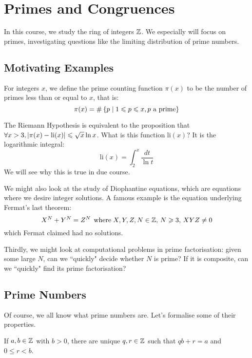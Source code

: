 \documentclass{article}
\begin{document}
\makecover

\section{Primes and Congruences}

In this course, we study the ring of integers $\mathbb{Z}$. We especially will focus on primes, investigating questions like the limiting distribution of prime numbers.

\subsection{Motivating Examples}
\label{subsection-intro-motivating-examples}

For integers $x$, we define the prime counting function $\pi (x)$ to be the number of primes less than or equal to $x$, that is:
\[
\pi (x) = \# \left\lbrace p \mid 1 \leqslant p \leqslant x, p \text{ a prime}  \right\rbrace
\]

The Riemann Hypothesis is equivalent to the proposition that
$\forall x > 3, \left\lvert \pi (x) - \mathrm{li} (x) \right\rvert \leqslant \sqrt{x} \ln x$.
What is this function $\mathrm{li} (x)$? It is the logarithmic integral:
\[
\mathrm{li} (x) = \int_2^x \frac{dt}{\ln t}
\]
We will see why this is true in due course.

We might also look at the study of Diophantine equations, which are equations where we desire integer solutions. A famous example is the equation underlying Fermat's last theorem:
\[
X^N + Y^N = Z^N \mathrel{\, \text{where}} X, Y, Z, N \in \mathbb{Z}, \, N \geqslant 3, \, XYZ \neq 0
\]
which Fermat claimed had no solutions.

Thirdly, we might look at computational problems in prime factorisation: given some large $N$, can we ``quickly" decide whether $N$ is prime?
If it is composite, can we ``quickly" find its prime factorisation?


\subsection{Prime Numbers}
\label{subsection-intro-prime-numbers}

Of course, we all know what prime numbers are. Let's formalise some of their properties.

\begin{proposition}
	\label{division-algorithm}
	If $a, b \in \mathbb{Z}$ with $b > 0$, there are unique $q, r \in \mathbb{Z}$ such that $qb + r = a$ and $0 \leq r < b$.
\end{proposition}
\end{document}
